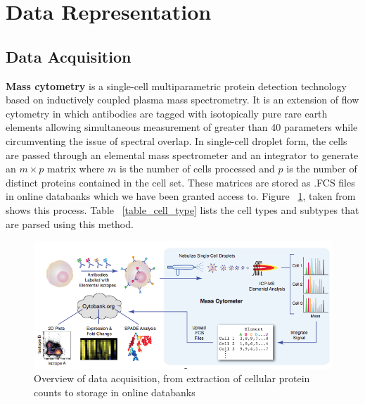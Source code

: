 \documentclass{article}
\begin{document}
\section{Data Representation}
\label{data_representation}

\subsection{Data Acquisition}

\textbf{Mass cytometry} is a single-cell multiparametric protein detection technology based on inductively coupled plasma mass spectrometry. It is an extension of flow cytometry in which antibodies are tagged with isotopically pure rare earth elements allowing simultaneous measurement of greater than 40 parameters while circumventing the issue of spectral overlap. In single-cell droplet form, the cells are passed through an elemental mass spectrometer and an integrator to generate an $m \times p$ matrix where $m$ is the number of cells processed and $p$ is the number of distinct proteins contained in the cell set. These matrices are stored as .FCS files in online databanks which we have been granted access to. Figure ~\ref{dataacquisition}, taken from \cite{Bendall:2011bm} shows this process. Table ~\ref{table_cell_type} lists the cell types and subtypes that are parsed using this method.

\begin{figure}
\vskip 0.2in
\begin{center}
\centerline{\includegraphics[width=\columnwidth]{DataAcquisition}}
\caption{Overview of data acquisition, from extraction of cellular protein counts to storage in online databanks}
\end{center}
\label{dataacquisition}
\vskip -0.2in
\end{figure}  
\end{document}
